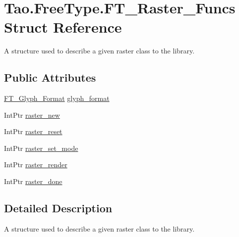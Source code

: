 \hypertarget{struct_tao_1_1_free_type_1_1_f_t___raster___funcs}{
\section{Tao.FreeType.FT\_\-Raster\_\-Funcs Struct Reference}
\label{struct_tao_1_1_free_type_1_1_f_t___raster___funcs}
}


A structure used to describe a given raster class to the library.  


\subsection*{Public Attributes}
\begin{DoxyCompactItemize}
\item 
\hyperlink{namespace_tao_1_1_free_type_ad679060462ff497f8f802417f8b719e0}{FT\_\-Glyph\_\-Format} \hyperlink{struct_tao_1_1_free_type_1_1_f_t___raster___funcs_ac734851f51d5b51cc595f9ccfd27fb9f}{glyph\_\-format}
\item 
IntPtr \hyperlink{struct_tao_1_1_free_type_1_1_f_t___raster___funcs_ab39802586af3d3bc80e5d6abaa14dea7}{raster\_\-new}
\item 
IntPtr \hyperlink{struct_tao_1_1_free_type_1_1_f_t___raster___funcs_a060ff926905607670e3cb3891f29e953}{raster\_\-reset}
\item 
IntPtr \hyperlink{struct_tao_1_1_free_type_1_1_f_t___raster___funcs_a068dbd394bc8379f9315de6d524dfb7b}{raster\_\-set\_\-mode}
\item 
IntPtr \hyperlink{struct_tao_1_1_free_type_1_1_f_t___raster___funcs_a43de05ab1fa3f7f81c5ebaeb49ec22c4}{raster\_\-render}
\item 
IntPtr \hyperlink{struct_tao_1_1_free_type_1_1_f_t___raster___funcs_a82a2a2c668424f02a468d5b1ded741e5}{raster\_\-done}
\end{DoxyCompactItemize}


\subsection{Detailed Description}
A structure used to describe a given raster class to the library. 

